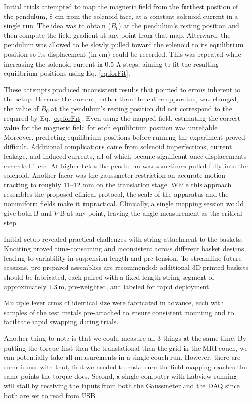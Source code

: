 
Initial trials attempted to map the magnetic field from the furthest position of the pendulum, 8 cm from the solenoid face, at a constant solenoid current in a single run. The idea was to obtain ($B_0$) at the pendulum’s resting position and then compute the field gradient at any point from that map. Afterward, the pendulum was allowed to be slowly pulled toward the solenoid to its equilibrium position so its displacement (in cm) could be recorded. This was repeated while increasing the solenoid current in 0.5 A steps, aiming to fit the resulting equilibrium positions using Eq. \ref{eq:forFit}. 

These attempts produced inconsistent results that pointed to errors inherent to the setup. Because the current, rather than the entire apparatus, was changed, the value of $B_0$ at the pendulum’s resting position did not correspond to the required by Eq. \ref{eq:forFit}. Even using the mapped field, estimating the correct value for the magnetic field for each equilibrium position was unreliable. Moreover, predicting equilibrium positions before running the experiment proved difficult. Additional complications came from solenoid imperfections, current leakage, and induced currents, all of which became significant once displacements exceeded 1 cm. At higher fields the pendulum was sometimes pulled fully into the solenoid. Another facor was the gaussmeter restriction on accurate motion tracking to roughly 11–12 mm on the translation stage. While this approach resembles the proposed clinical protocol, the scale of the apparatus and the nonuniform fields make it impractical. Clinically, a single mapping session would give both B and $\nabla$B at any point, leaving the angle measurement as the critical step.




Initial setup revealed practical challenges with string attachment to the baskets. Knotting proved time-consuming and inconsistent across different basket designs, leading to variability in suspension length and pre-tension. To streamline future sessions, pre-prepared assemblies are recommended: additional 3D-printed baskets should be fabricated, each paired with a fixed-length string segment of approximately 1.3\,m, pre-weighted, and labeled for rapid deployment.



Multiple lever arms of identical size were fabricated in advance, each with samples of the test metals pre-attached to ensure consistent mounting and to facilitate rapid swapping during trials.



Another thing to note is that we could measure all 3 things at the same time. By putting the torque first then the translational then the grid in the MRI couch, we can potentially take all measurements in a single couch run. However, there are some issues with that, first we needed to make sure the field mapping reaches the same points the torque does. Second, a single computer with Labview running will stall by receiving the inputs from both the Gaussmeter and the DAQ since both are set to read from USB. 